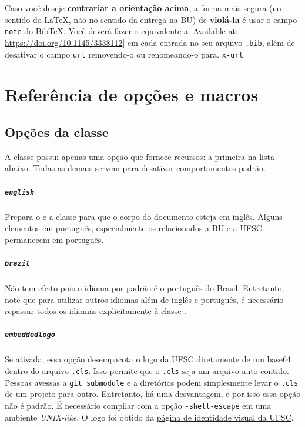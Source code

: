\documentclass[embeddedlogo]{../ufsc-thesis-rn46-2019}
\begin{document}
Caso você deseje \textbf{contrariar a orientação acima}, a forma mais segura (no
sentido do LaTeX, não no sentido da entrega na BU) de \textbf{violá-la} é usar o
campo \texttt{note} do BibTeX. Você deverá fazer o equivalente a
\mt|Available at: \url{https://doi.org/10.1145/3338112}| em cada entrada no seu
arquivo \texttt{.bib}, além de desativar o campo \texttt{url} removendo-o ou renomeando-o
para. \texttt{x-url}.

\chapter{Referência de opções e macros}
\label{ch:ref}

\section{Opções da classe}

A classe possui apenas uma opção que fornece recursos: a primeira na lista
abaixo. Todas as demais servem para desativar comportamentos padrão.

\paragraph*{\texttt{english}} Prepara o \abnTeX{} e a classe para que o corpo
do documento esteja em inglês. Alguns elementos em português, especialmente os
relacionados a BU e a UFSC permanecem em português.

\paragraph*{\texttt{brazil}} Não tem efeito pois o idioma por padrão é o
português do Brasil. Entretanto, note que para utilizar outros idiomas além de
inglês e português, é necessário repassar todos os idiomas explicitamente à
classe \abnTeX.

\paragraph*{\texttt{embeddedlogo}} Se ativada, essa opção desempacota o logo da
UFSC diretamente de um base64 dentro do arquivo \texttt{.cls}. Isso permite que
o \texttt{.cls} seja um arquivo auto-contido. Pessoas avessas a \texttt{git
  submodule} e a diretórios podem simplesmente levar o \texttt{.cls} de um
projeto para outro. Entretanto, há uma desvantagem, e por isso essa opção não é
padrão. É necessário compilar com a opção \texttt{-shell-escape} em uma ambiente
\emph{UNIX-like}. O logo foi obtido da \href{http://identidade.ufsc.br/}{página
  de identidade visual da UFSC}.
\end{document}
